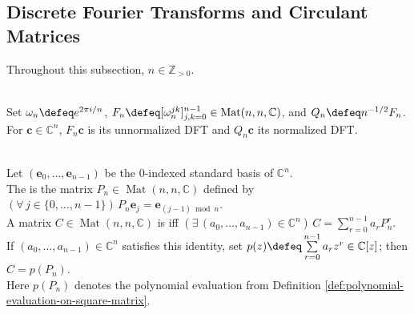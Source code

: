 \subsection{Discrete Fourier Transforms and Circulant Matrices}

Throughout this subsection, $n\in\mathbb{Z}_{>0}$.

\begin{definition} \label{def:discrete-fourier-matrix} \\
Set $\omega_n\defeq e^{2\pi i/n}$, $F_n\defeq[\omega_n^{jk}]_{j,k=0}^{n-1}\in\operatorname{Mat}(n,n,\mathbb{C})$, and $Q_n\defeq n^{-1/2}F_n$.\\
For $\mathbf{c}\in\mathbb{C}^n$, $F_n\mathbf{c}$ is its unnormalized DFT and $Q_n\mathbf{c}$ its normalized DFT.
\end{definition}

\begin{definition} \label{def:circulant-matrix-cyclic-shift} \\
Let $(\mathbf{e}_0,\ldots,\mathbf{e}_{n-1})$ be the $0$-indexed standard basis of $\mathbb{C}^n$.\\
The  is the matrix $P_n\in\operatorname{Mat}(n,n,\mathbb{C})$ defined by $(\forall\,j\in\{0,\ldots,n-1\})\,P_n\mathbf{e}_j=\mathbf{e}_{(j-1)\bmod n}$.\\
A matrix $C\in\operatorname{Mat}(n,n,\mathbb{C})$ is  iff $(\exists\,(a_0,\ldots,a_{n-1})\in\mathbb{C}^n)\,C=\sum\limits_{r=0}^{n-1}a_rP_n^r$.\\
If $(a_0,\ldots,a_{n-1})\in\mathbb{C}^n$ satisfies this identity, set $p(z)\defeq\sum\limits_{r=0}^{n-1}a_rz^r\in\mathbb{C}[z]$; then $C=p(P_n)$.\\
Here $p(P_n)$ denotes the polynomial evaluation from Definition \ref{def:polynomial-evaluation-on-square-matrix}.
\end{definition}

